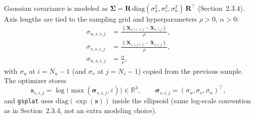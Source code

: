 \documentclass{report}
\begin{document}
Gaussian covariance is modeled as $\boldsymbol{\Sigma}=\mathbf{R}\,\mathrm{diag}(\sigma_u^2,\sigma_v^2,\sigma_n^2)\,\mathbf{R}^\top$ (Section~2.3.4). Axis lengths are tied to the sampling grid and hyperparameters $\rho>0$, $\alpha>0$:
\begin{align}
\sigma_{u,s,i,j} &= \frac{\bigl\|\mathbf{X}_{s,i+1,j}-\mathbf{X}_{s,i,j}\bigr\|}{\rho}, \\
\sigma_{v,s,i,j} &= \frac{\bigl\|\mathbf{X}_{s,i,j+1}-\mathbf{X}_{s,i,j}\bigr\|}{\rho}, \\
\sigma_{n,s,i,j} &= \frac{\alpha}{\rho},
\label{eq:gaussian_scales}
\end{align}
with $\sigma_{u}$ at $i=N_u-1$ (and $\sigma_v$ at $j=N_v-1$) copied from the previous sample. The optimizer stores
\begin{equation}
\mathbf{s}_{s,i,j}=\log\bigl(\max(\boldsymbol{\sigma}_{s,i,j},\varepsilon)\bigr)\in\mathbb{R}^3,
\qquad
\boldsymbol{\sigma}_{s,i,j}=(\sigma_u,\sigma_v,\sigma_n)^\top,
\label{eq:log_scales}
\end{equation}
and \texttt{gsplat} uses $\mathrm{diag}(\exp(\mathbf{s}))$ inside the ellipsoid (same log-scale convention as in Section~2.3.4, not an extra modeling choice).
\end{document}

